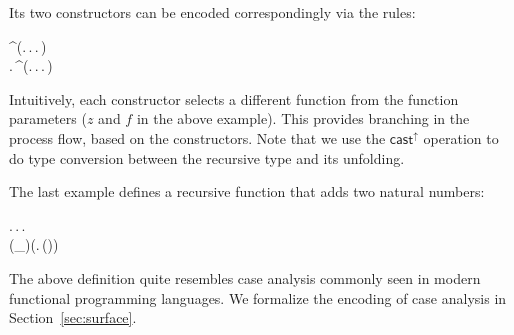 Its two constructors can be encoded correspondingly via the \cast rules:
\begin{hscode}\SaveRestoreHook
{}%
%
%
\>[3]{}\mathrel{=}^\uparrow{}\;(\lambda {}\mathbin{:}\star.\,\lambda {}\mathbin{:}.\,\lambda {}\mathbin{:}\to {}.\,){}\<[E]%
\\
\>[3]{}\mathrel{=}\lambda {}\mathbin{:}.\,^\uparrow{}\;(\lambda {}\mathbin{:}\star.\,\lambda {}\mathbin{:}.\,\lambda {}\mathbin{:}\to {}.\,\;){}\<[E]%
\ColumnHook
\end{hscode}\resethooks
Intuitively, each constructor selects a different function from the
function parameters ($z$ and $f$ in the above example). This provides
branching in the process flow, based on the constructors. Note that we
use the $ \mathsf{cast}^{\uparrow} $ operation to do type conversion between the
recursive type and its unfolding.

The last example defines a recursive function that adds two natural
numbers:
\begin{hscode}\SaveRestoreHook
{}%
%
%
%
\>[3]{}\mu\;\mathbin{:}\to {}\to {}.\,\lambda {}\mathbin{:}.\,\lambda {}\mathbin{:}.\,{}\<[E]%
\\
\>[3]{}\<[7]%
\>[7]{}(_\downarrow\;)\;\;\;(\lambda {}\mathbin{:}.\,\;(\;\;)){}\<[E]%
\ColumnHook
\end{hscode}\resethooks
The above definition quite resembles case analysis commonly seen in
modern functional programming languages. We formalize the encoding of
case analysis in Section~\ref{sec:surface}.



